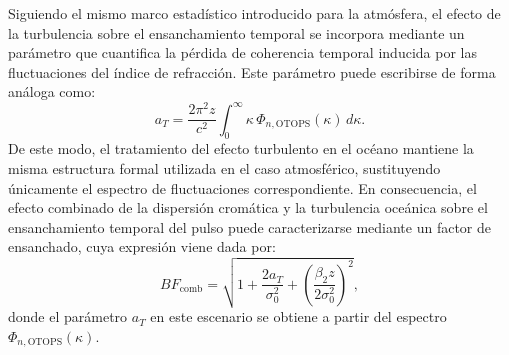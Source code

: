 Siguiendo el mismo marco estadístico introducido para la atmósfera, el efecto de la turbulencia sobre el ensanchamiento temporal se incorpora mediante un parámetro que cuantifica la pérdida de coherencia temporal inducida por las fluctuaciones del índice de refracción. Este parámetro puede escribirse de forma análoga como:
\begin{equation}
a_T=\frac{2\pi^{2}z}{c^{2}}
\int_{0}^{\infty}\kappa\,\Phi_{n,\mathrm{OTOPS}}(\kappa)\,d\kappa.
\end{equation}
De este modo, el tratamiento del efecto turbulento en el océano mantiene la misma estructura formal utilizada en el caso atmosférico, sustituyendo únicamente el espectro de fluctuaciones correspondiente. En consecuencia, el efecto combinado de la dispersión cromática y la turbulencia oceánica sobre el ensanchamiento temporal del pulso puede caracterizarse mediante un factor de ensanchado, cuya expresión viene dada por:
\begin{equation}
BF_{\text{comb}}
=\sqrt{1+\frac{2a_T}{\sigma_0^{2}}
+\left(\frac{\beta_2 z}{2\sigma_0^{2}}\right)^2},
\end{equation}
donde el parámetro $a_T$ en este escenario se obtiene a partir del espectro $\Phi_{n,\mathrm{OTOPS}}(\kappa)$.


